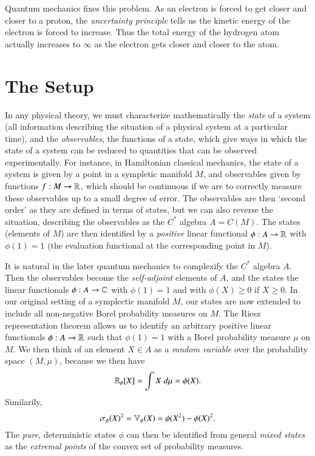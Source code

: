 Quantum mechanics fixes this problem. As an electron is forced to get closer and closer to a proton, the \emph{uncertainty principle} tells us the kinetic energy of the electron is forced to increase. Thus the total energy of the hydrogen atom actually increases to $\infty$ as the electron gets closer and closer to the atom.

\chapter{The Setup}

In any physical theory, we must characterize mathematically the \emph{state} of a system (all information describing the situation of a physical system at a particular time), and the \emph{observables}, the functions of a state, which give ways in which the state of a system can be reduced to quantities that can be observed experimentally. For instance, in Hamiltonian classical mechanics, the state of a system is given by a point in a sympletic manifold $M$, and observables given by functions $f: M \to \operatorname{\mathbb{R}}$, which should be continuous if we are to correctly measure these observables up to a small degree of error. The observables are then `second order' as they are defined in terms of states, but we can also reverse the situation, describing the observables as the $C^*$ algebra $A = C(M)$. The states (elements of $M$) are then identified by a \emph{positive} linear functional $\phi: A \to \operatorname{\mathbb{R}}$ with $\phi(1) = 1$ (the evaluation functional at the corresponding point in $M$).

It is natural in the later quantum mechanics to complexify the $C^*$ algebra $A$. Then the observables become the \emph{self-adjoint} elements of $A$, and the states the linear functionals $\phi: A \to \operatorname{\mathbb{C}}$ with $\phi(1) = 1$ and with $\phi(X) \geq 0$ if $X \geq 0$. In our original setting of a symplectic manifold $M$, our states are now extended to include all non-negative Borel probability measures on $M$. The Riesz representation theorem allows us to identify an arbitrary positive linear functionals $\phi: A \to \operatorname{\mathbb{R}}$ such that $\phi(1) = 1$ with a Borel probability measure $\mu$ on $M$. We then think of an element $X \in A$ as a \emph{random variable} over the probability space $(M,\mu)$, because we then have
%
\[ \operatorname{\mathbb{E}}_\phi[X] = \int X\; d\mu = \phi(X). \]
%
Similarily,
%
\[ \sigma_\phi(X)^2 = \operatorname{\mathbb{V}}_\phi(X) = \phi(X^2) - \phi(X)^2. \]
%
The \emph{pure}, deterministic states $\phi$ can then be identified from general \emph{mixed states} as the \emph{extremal points} of the convex set of probability measures.

